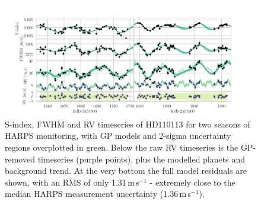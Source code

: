 \documentclass[fleqn,usenatbib]{mnras}
\newcommand{\ms}{m\,s$^{-1}$}
\newcommand{\TSindexperiod}{ $ 39.0 \pm 11.0 $ }
\begin{document}

\begin{figure}
	\includegraphics[width=\textwidth, trim={0.85cm 0.8 1.9cm 0.4cm}]{Combined_RV_plots_3_GPs_nontransiting_c.pdf}
    \caption{S-index, FWHM and RV timeseries of HD110113 for two seasons of HARPS monitoring, with GP models and 2-sigma uncertainty regions overplotted in green. Below the raw RV timeseries is the GP-removed timeseries (purple points), plus the modelled planets and background trend. At the very bottom the full model residuals are shown, with an RMS of only 1.31\,\ms{} - extremely close to the median HARPS measurement uncertainty (1.36\,\ms{}).}
    \label{fig:RVs}
\end{figure}
\end{document}
